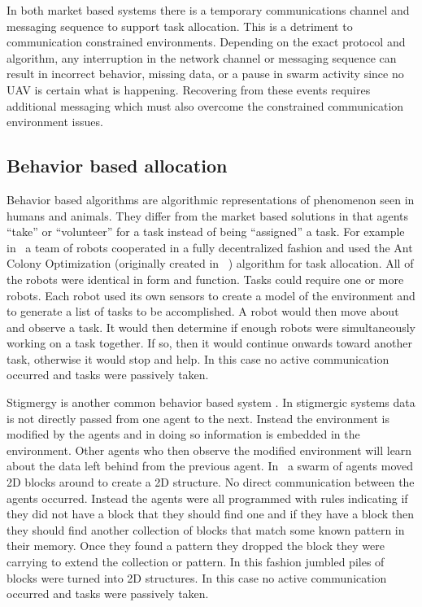 In both market based systems there is a temporary communications channel and messaging sequence to support task allocation.  This is a detriment to communication constrained environments.  Depending on the exact protocol and algorithm, any interruption in the network channel or messaging sequence can result in incorrect behavior, missing data, or a pause in swarm activity since no UAV is certain what is happening.  Recovering from these events requires additional messaging which must also overcome the constrained communication environment issues.

\subsection{Behavior based allocation}

Behavior based algorithms are algorithmic representations of phenomenon seen in humans and animals. They differ from the market based solutions in that agents ``take'' or ``volunteer'' for a task instead of being ``assigned'' a task.  For example in~\textcite{ant_colony_opt} a team of robots cooperated in a fully decentralized fashion and used the Ant Colony Optimization (originally created in ~\textcite{orig_aco}) algorithm for task allocation.  All of the robots were identical in form and function.  Tasks could require one or more robots.  Each robot used its own sensors to create a model of the environment and to generate a list of tasks to be accomplished.  A robot would then move about and observe a task.  It would then determine if enough robots were simultaneously working on a task together.  If so, then it would continue onwards toward another task, otherwise it would stop and help.  In this case no active communication occurred and tasks were passively taken.

Stigmergy is another common behavior based system \parencite{history_stigmergy} \parencite{social_cog_stigmergy}. In stigmergic systems data is not directly passed from one agent to the next.  Instead the environment is modified by the agents and in doing so information is embedded in the environment.  Other agents who then observe the modified environment will learn about the data left behind from the previous agent.  In~\textcite{stigmergy_building} a swarm of agents moved 2D blocks around to create a 2D structure.  No direct communication between the agents occurred.  Instead the agents were all programmed with rules indicating if they did not have a block that they should find one and if they have a block then they should find another collection of blocks that match some known pattern in their memory.  Once they found a pattern they dropped the block they were carrying to extend the collection or pattern.  In this fashion jumbled piles of blocks were turned into 2D structures.  In this case no active communication occurred and tasks were passively taken.

